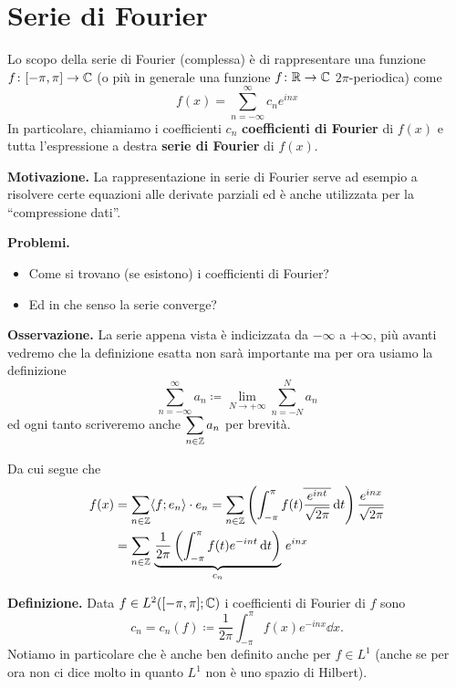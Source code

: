 %
%


\chapter{Serie di Fourier}

Lo scopo della serie di Fourier (complessa) è di rappresentare una funzione $f \colon [-\pi, \pi] \to \mathbb C$ (o più in generale una funzione $f \colon \mathbb R \to \mathbb C$ $2\pi$-periodica) come
$$
f(x) = \sum_{n=-\infty}^\infty c_n e^{i n x}
$$
In particolare, chiamiamo i coefficienti $c_n$ \textbf{coefficienti di Fourier} di $f(x)$ e tutta l'espressione a destra \textbf{serie di Fourier} di $f(x)$.

\textbf{Motivazione.}
La rappresentazione in serie di Fourier serve ad esempio a risolvere certe equazioni alle derivate parziali ed è anche utilizzata per la ``compressione dati''.

\textbf{Problemi.}
\begin{itemize}
	\item Come si trovano (se esistono) i coefficienti di Fourier?
	\item Ed in che senso la serie converge?
\end{itemize}

\textbf{Osservazione.}
La serie appena vista è indicizzata da $-\infty$ a $+\infty$, più avanti vedremo che la definizione esatta non sarà importante ma per ora usiamo la definizione
$$
\sum_{n=-\infty}^\infty a_n \coloneqq \lim_{N \to +\infty} \sum_{n = -N}^N a_n
$$
ed ogni tanto scriveremo anche $\displaystyle \sum_{n \in \mathbb Z} a_n$ per brevità.


Da cui segue che
$$
\begin{aligned}
	f(x) 
	&= \sum_{n \in \mathbb Z} \langle f; e_n \rangle \cdot e_n
	= \sum_{n \in \mathbb Z} \left( \int_{-\pi}^\pi f(t) \overline{\frac{e^{int}}{\sqrt{2\pi}}} \,\mathrm{d} t \right) \frac{e^{inx}}{\sqrt{2\pi}} \\
	&= \sum_{n \in \mathbb Z} \, \underbrace{\frac{1}{2\pi} \left( \int_{-\pi}^\pi f(t) e^{-int} \,\mathrm{d} t \right)}_{c_n} \, e^{inx}
\end{aligned}
$$

\textbf{Definizione.}
Data $f \in L^2([-\pi, \pi]; \mathbb C)$ i coefficienti di Fourier di $f$ sono
$$
	c_n = c_n(f) \coloneqq \frac{1}{2\pi} \int_{-\pi}^\pi f(x) e^{-inx} \dd x.
$$
Notiamo in particolare che è anche ben definito anche per $f \in L^1$ (anche se per ora non ci dice molto in quanto $L^1$ non è uno spazio di Hilbert).

